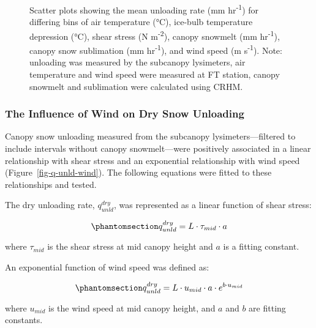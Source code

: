 \documentclass[
]{agujournal2019}
\begin{document}
\begin{figure}[htbp]


\caption{\label{fig-q-unld-all-bins}Scatter plots showing the mean
unloading rate (mm hr\textsuperscript{-1}) for differing bins of air
temperature (°C), ice-bulb temperature depression (°C), shear stress (N
m\textsuperscript{-2}), canopy snowmelt (mm hr\textsuperscript{-1}),
canopy snow sublimation (mm hr\textsuperscript{-1}), and wind speed (m
s\textsuperscript{-1}). Note: unloading was measured by the subcanopy
lysimeters, air temperature and wind speed were measured at FT station,
canopy snowmelt and sublimation were calculated using CRHM.}

\end{figure}%

\subsubsection{The Influence of Wind on Dry Snow
Unloading}\label{sec-dry-unld}

Canopy snow unloading measured from the subcanopy lysimeters---filtered
to include intervals without canopy snowmelt---were positively
associated in a linear relationship with shear stress and an exponential
relationship with wind speed (Figure~\ref{fig-q-unld-wind}). The
following equations were fitted to these relationships and tested.

The dry unloading rate, \(q_{unld}^{dry}\), was represented as a linear
function of shear stress:

\begin{equation}\phantomsection\label{eq-q-unld-tau}{
q_{unld}^{dry} = L \cdot \tau_{mid} \cdot a
}\end{equation}

where \(\tau_{mid}\) is the shear stress at mid canopy height and \(a\)
is a fitting constant.

An exponential function of wind speed was defined as:

\begin{equation}\phantomsection\label{eq-q-unld-wind}{
q_{unld}^{dry} = L \cdot u_{mid} \cdot a \cdot e^{b\cdot u_{mid}}
}\end{equation}

where \(u_{mid}\) is the wind speed at mid canopy height, and \(a\) and
\(b\) are fitting constants.
\end{document}
